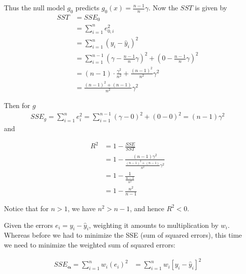 \documentclass[12pt]{article}
\begin{document}
\begin{enumerate}
Thus the null model $g_0$ predicts $g_0(x) = \frac{n-1}{n}\gamma$. Now the $SST$
is given by
\begin{align*}
	SST &= SSE_0\\
	&= \sum_{i=1}^{n}e_{0, i}^2\\
	&= \sum_{i=1}^{n}(y_i-\hat{y}_i)^2\\
	&=\sum_{i=1}^{n-1}(\gamma - \frac{n-1}{n}\gamma)^2 + (0-\frac{n-1}{n}\gamma)^2\\
	&=(n-1)\cdot \frac{\gamma^2}{n^2} + \frac{(n-1)^2}{n^2}\gamma^2\\
	&=\frac{(n-1)^2+(n-1)}{n^2}\gamma^2
\end{align*}

Then for $g$
\begin{align*}
	SSE_g = \sum_{i=1}^{n}e_i^2 = \sum_{i=1}^{n-1}(\gamma - 0)^2 + (0-0)^2=(n-1)\gamma^2
\end{align*}
and

\begin{align*}
	R^2 &= 1 - \frac{SSE}{SST}\\
	&= 1 - \frac{(n-1)\gamma^2}{\frac{(n-1)^2+(n-1)}{n^2}\gamma^2}\\
	&= 1 - \frac{1}{\frac{n-1}{n^2}}\\
	&= 1 - \frac{n^2}{n-1}
\end{align*}

Notice that for $n>1$, we have $n^2>n-1$, and hence $R^2<0$.




Given the errors $e_i = y_i - \hat{y}_i$, weighting it amounts to multiplication by $w_i$.
Whereas before we had to minimize the SSE (sum of squared errors), this time we need to
minimize the weighted sum of squared errors:

\begin{align*}
	SSE_{\mathbf{\alpha}} = \sum_{i=1}^{n}w_i(e_i)^2 &= \sum_{i=1}^{n}w_i[y_i - \hat{y}_i]^2
\end{align*}


\end{enumerate}
\end{document}
